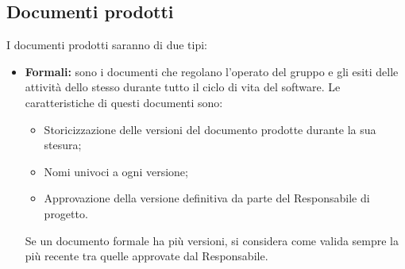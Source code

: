 \subsection{Documenti prodotti}
I documenti prodotti saranno di due tipi:
\begin{itemize}
    \item \textbf{Formali:} sono i documenti che regolano l'operato del gruppo e gli esiti delle attività dello stesso durante tutto il ciclo di vita del software.
    Le caratteristiche di questi documenti sono:
    \begin{itemize}
        \item Storicizzazione delle versioni del documento prodotte durante la sua stesura;
        \item Nomi univoci a ogni versione;
        \item Approvazione della versione definitiva da parte del Responsabile di progetto.
    \end{itemize}
    Se un documento formale ha più versioni, si considera come valida sempre la più recente tra quelle approvate dal Responsabile.


\end{itemize}
